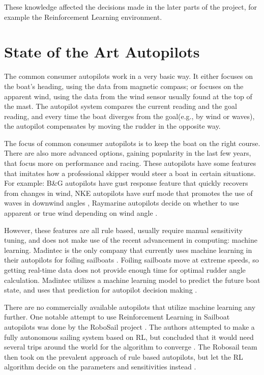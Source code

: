 \documentclass[12pt,twoside]{report}
\begin{document}
These knowledge affected the decisions made in the later parts of the project, for example the Reinforcement Learning environment.


\section{State of the Art Autopilots}

The common consumer autopilots work in a very basic way. It either focuses on the boat's heading, using the data from magnetic compass; or focuses on the apparent wind, using the data from the wind sensor usually found at the top of the mast. The autopilot system compares the current reading and the goal reading, and every time the boat diverges from the goal(e.g., by wind or waves), the autopilot compensates by moving the rudder in the opposite way. 

The focus of common consumer autopilots is to keep the boat on the right course. There are also more advanced options, gaining popularity in the last few years, that focus more on performance and racing. These autopilots have some features that imitates how a professional skipper would steer a boat in certain situations. For example: B\&G autopilots \cite{bandg} have gust response feature that quickly recovers from changes in wind, NKE autopilots \cite{nke} have surf mode that promotes the use of waves in downwind angles \cite{yachting_world_2020}, Raymarine autopilots \cite{raymarine} decide on whether to use apparent or true wind depending on wind angle \cite{cruising_world_2019}.

However, these features are all rule based, usually require manual sensitivity tuning, and does not make use of the recent advancement in computing: machine learning. Madintec is the only company that currently uses machine learning in their autopilots for foiling sailboats \cite{madintec}. Foiling sailboats move at extreme speeds, so getting real-time data does not provide enough time for optimal rudder angle calculation. Madintec utilizes a machine learning model to predict the future boat state, and uses that prediction for autopilot decision making \cite{madintec-eric}.

There are no commercially available autopilots that utilize machine learning any further. One notable attempt to use Reinforcement Learning in Sailboat autopilots was done by the RoboSail project \cite{robosail1}. The authors attempted to make a fully autonomous sailing system based on RL, but concluded that it would need several trips around the world for the algorithm to converge \cite{robosail2}. The Robosail team then took on the prevalent approach of rule based autopilots, but let the RL algorithm decide on the parameters and sensitivities instead \cite{robosail3}.
\end{document}
